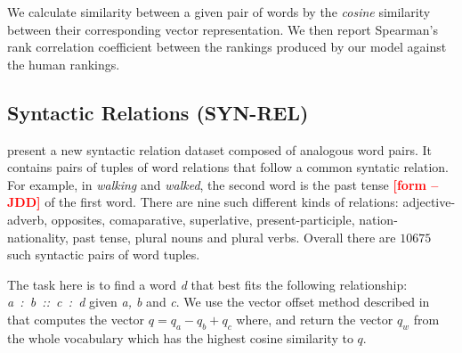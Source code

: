 \documentclass[11pt]{article}
\DeclareMathOperator*{\argmax}{arg\,max}
\newcommand{\jdd}[1]{\textcolor{red}{\bf\small [#1 --JDD]}}
\begin{document}
We calculate similarity between a given pair of words by the \textit{cosine}
similarity between their corresponding vector representation.
We then report Spearman's rank correlation coefficient 
\cite{citeulike:8703893} between the rankings produced by our model against the human rankings.

\begin{comment}
\subsection{Sentence Completion (SENT)}
The Microsoft Research sentence completion dataset contains $1040$ sentences
from each of which one word has been removed. The task is to correctly predict
the missing word from a given list of $5$ other words per sentence. We average
the word vectors of a given sentence $q_{sent} = \sum_{i=1, i\neq j}^{N} q_{w_i}/N$, where
$w_j$ is the missing word and 
compute the cosine similarity of $q_{sent}$
vector with each of the options. The word with the highest similarity is chosen
as the missing word placeholder.
\end{comment}

\subsection{Syntactic Relations (SYN-REL)}
\label{sec:syn-rel}

 present a new syntactic relation dataset composed of analogous word pairs. 
It contains pairs of tuples of word relations that follow a common syntatic relation. For example, in \textit{walking} and \textit{walked}, the second word is the past tense \jdd{form}
of the first word. There are nine such different kinds of relations: adjective-adverb,
opposites, comaparative, superlative, present-participle, 
nation-nationality, past tense, plural nouns and plural verbs.
Overall there are $10675$ such syntactic pairs of word tuples.

The task here is to find a word \textit{d} that best fits the following relationship: 
\textit{a~:~b~::~c~:~d} given \textit{a, b} and \textit{c}. 
We use the vector offset method described in 
 that computes the vector $q = q_a - q_b + q_c$ where, 
 and return the 
vector $q_w$ from the whole vocabulary which has the highest cosine similarity to $q$.
\end{document}
